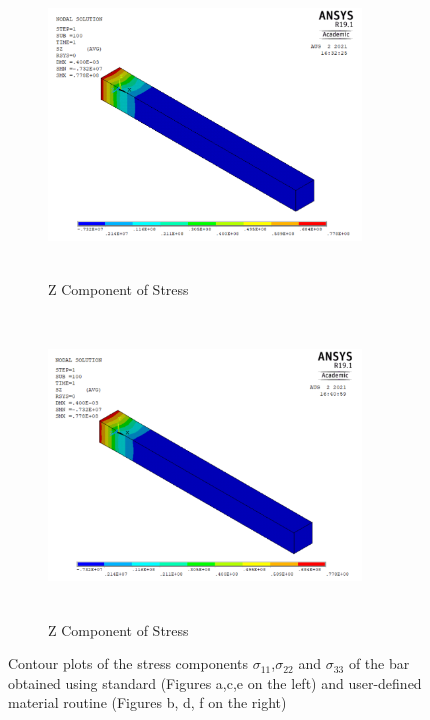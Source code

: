 \documentclass[12pt]{report}
\begin{document}
\begin{figure}[htbp!]\ContinuedFloat     
     \begin{subfigure}[b]{0.4\textwidth}
         \includegraphics[width=8.3cm,height=8cm,keepaspectratio]{17.Ansys_SZ.png}
         \caption{Z Component of Stress}
         \label{fig:Z Component of Stress}
     \end{subfigure}
     \hspace{1.8cm}
     \begin{subfigure}[b]{0.4\textwidth}
         \includegraphics[width=8.3cm,height=8cm,keepaspectratio]{20.User_SZ.png}
         \caption{Z Component of Stress}
         \label{fig:Z Component of Stress2}
     \end{subfigure}
        \caption{Contour plots of the stress components $\sigma_{11}$,$\sigma_{22}$ and $\sigma_{33}$ of the bar obtained using standard (Figures a,c,e on the left) and user-defined material routine (Figures b, d, f on the right)}
        \label{fig:USERMAT}     
\end{figure}
\FloatBarrier
\end{document}
